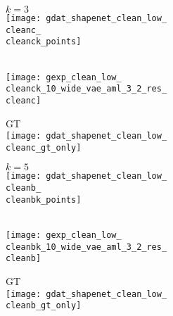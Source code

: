 \begin{figure}[t]
{    \begin{subfigure}[t]{0.5\textwidth}
        \vspace{0px}\centering
   		\begin{subfigure}[t]{0.15\textwidth}
   			\vspace{0px}\centering
   			$k = 3$\\
   			\texttt{[image: gdat\_shapenet\_clean\_low\_\\cleanc\_\\cleanck\_points]}
   		\end{subfigure}
   		\begin{subfigure}[t]{0.15\textwidth}
   			\vspace{0px}\centering
   			\AML\\
   			\texttt{[image: gexp\_clean\_low\_\\cleanck\_10\_wide\_vae\_aml\_3\_2\_res\_\\cleanc]}
   		\end{subfigure}
   		\begin{subfigure}[t]{0.15\textwidth}
   			\vspace{0px}\centering
   			GT\\
   			\texttt{[image: gdat\_shapenet\_clean\_low\_\\cleanc\_gt\_only]}
   		\end{subfigure}
   		\begin{subfigure}[t]{0.15\textwidth}
   			\vspace{0px}\centering
   			$k = 5$\\
   			\texttt{[image: gdat\_shapenet\_clean\_low\_\\cleanb\_\\cleanbk\_points]}
   		\end{subfigure}
   		\begin{subfigure}[t]{0.15\textwidth}
   			\vspace{0px}\centering
   			\AML\\
   			\texttt{[image: gexp\_clean\_low\_\\cleanbk\_10\_wide\_vae\_aml\_3\_2\_res\_\\cleanb]}
   		\end{subfigure}
   		\begin{subfigure}[t]{0.15\textwidth}
   			\vspace{0px}\centering
   			GT\\
   			\texttt{[image: gdat\_shapenet\_clean\_low\_\\cleanb\_gt\_only]}
   		\end{subfigure}

\end{subfigure}}
\end{figure}
